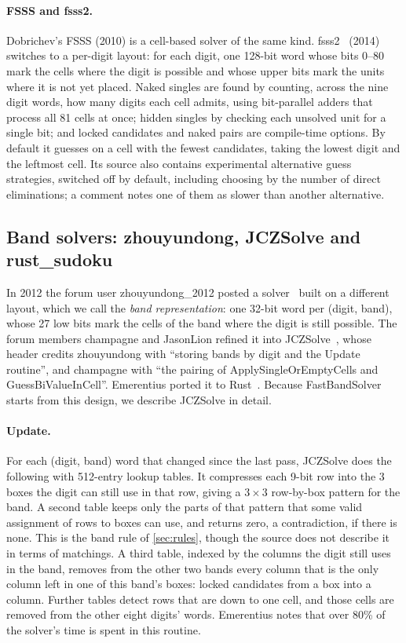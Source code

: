 \documentclass[11pt]{article}
\theoremstyle{definition}
\theoremstyle{plain}
\begin{document}
\paragraph{FSSS and fsss2.} Dobrichev's FSSS (2010) is a cell-based solver of the same kind. fsss2~\cite{dobrichev2014fsss2}
(2014) switches to a per-digit layout: for each digit, one 128-bit word whose bits 0--80 mark the cells where the
digit is possible and whose upper bits mark the units where it is not yet placed. Naked singles are found by counting,
across the nine digit words, how many digits each cell admits, using bit-parallel adders that process all 81 cells at
once; hidden singles by checking each unsolved unit for a single bit; and locked candidates and naked pairs are
compile-time options. By default it guesses on a cell with the fewest candidates, taking the lowest digit and the
leftmost cell. Its source also contains experimental alternative guess strategies, switched off by default, including
choosing by the number of direct eliminations; a comment notes one of them as slower than another alternative.

\subsection{Band solvers: zhouyundong, JCZSolve and rust\_sudoku}

In 2012 the forum user zhouyundong\_2012 posted a solver~\cite{zhouyundong2012solver} built on a different layout,
which we call the \emph{band representation}: one 32-bit word per (digit, band), whose 27 low bits mark the cells of the
band where the digit is still possible. The forum members champagne and JasonLion refined it into
JCZSolve~\cite{jczsolve2016}, whose header credits zhouyundong with ``storing bands by digit and the Update routine'',
and champagne with ``the pairing of ApplySingleOrEmptyCells and GuessBiValueInCell''. Emerentius ported it to
Rust~\cite{emerentius2018sudoku}. Because FastBandSolver starts from this design, we describe JCZSolve in detail.

\paragraph{Update.} For each (digit, band) word that changed since the last pass, JCZSolve does the following with
512-entry lookup tables. It compresses each 9-bit row into the 3 boxes the digit can still use in that row, giving a
$3\times 3$ row-by-box pattern for the band. A second table keeps only the parts of that pattern that some valid
assignment of rows to boxes can use, and returns zero, a contradiction, if there is none. This is the band rule of
\cref{sec:rules}, though the source does not describe it in terms of matchings. A third table, indexed by the columns
the digit still uses in the band, removes from the other two bands every column that is the only column left in one
of this band's boxes: locked candidates from a box into a column. Further tables detect rows that are down to one
cell, and those cells are removed from the other eight digits' words. Emerentius notes that over 80\% of the solver's
time is spent in this routine.
\end{document}
